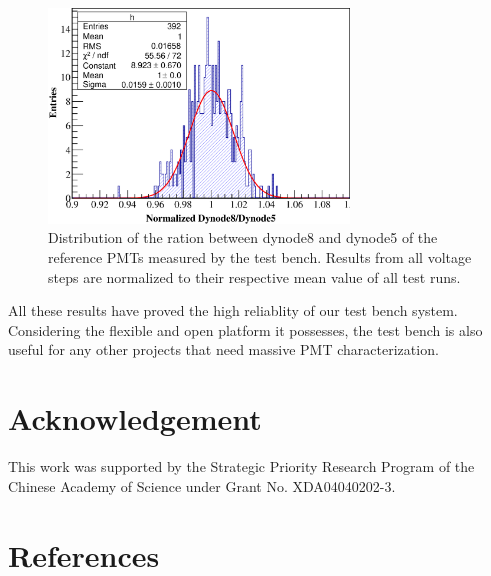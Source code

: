 \documentclass[review, times]{elsarticle}
\begin{document}
\begin{figure}
 \centering
 \includegraphics[width=80mm]{RefDy58Dist}
\caption{Distribution of the ration between dynode8 and dynode5 of the reference PMTs measured by the test bench.
Results from all voltage steps are normalized to their respective mean value of all test runs.}
\label{fig:dy58_stabiltiy}
\end{figure} 

All these results have proved the high reliablity of our test bench system.
Considering the flexible and open platform it possesses, the test bench is also useful for any other projects that need massive PMT characterization. 

\section*{Acknowledgement}

This work was supported by the Strategic Priority Research Program of the Chinese Academy of Science under Grant No. XDA04040202-3.


\section*{References}

\end{document}
